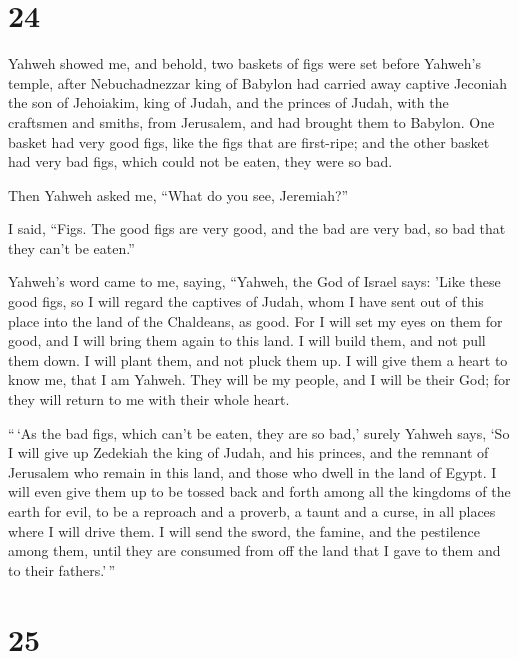 \hypertarget{section-23}{%
\section{24}\label{section-23}}

 Yahweh showed me, and behold, two baskets of figs were
set before Yahweh's temple, after Nebuchadnezzar king of Babylon had
carried away captive Jeconiah the son of Jehoiakim, king of Judah, and
the princes of Judah, with the craftsmen and smiths, from Jerusalem, and
had brought them to Babylon.  One basket had very good
figs, like the figs that are first-ripe; and the other basket had very
bad figs, which could not be eaten, they were so bad.

 Then Yahweh asked me, ``What do you see, Jeremiah?''

I said, ``Figs. The good figs are very good, and the bad are very bad,
so bad that they can't be eaten.''

 Yahweh's word came to me, saying, 
``Yahweh, the God of Israel says: 'Like these good figs, so I will
regard the captives of Judah, whom I have sent out of this place into
the land of the Chaldeans, as good.  For I will set my
eyes on them for good, and I will bring them again to this land. I will
build them, and not pull them down. I will plant them, and not pluck
them up.  I will give them a heart to know me, that I am
Yahweh. They will be my people, and I will be their God; for they will
return to me with their whole heart.

 ``\,`As the bad figs, which can't be eaten, they are so
bad,' surely Yahweh says, `So I will give up Zedekiah the king of Judah,
and his princes, and the remnant of Jerusalem who remain in this land,
and those who dwell in the land of Egypt.  I will even
give them up to be tossed back and forth among all the kingdoms of the
earth for evil, to be a reproach and a proverb, a taunt and a curse, in
all places where I will drive them.  I will send the
sword, the famine, and the pestilence among them, until they are
consumed from off the land that I gave to them and to their
fathers.'\,''

\hypertarget{section-24}{%
\section{25}\label{section-24}}


